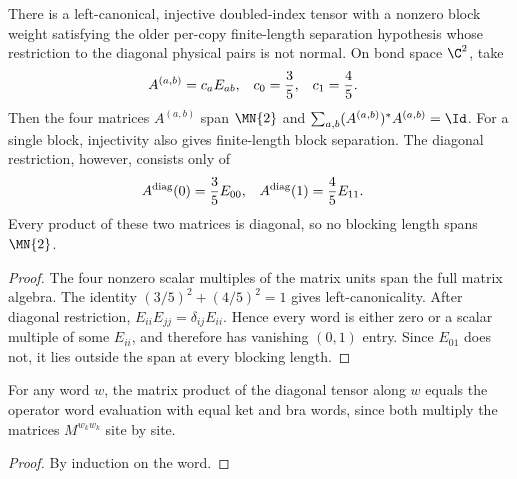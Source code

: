 \begin{theorem}
    \label{thm:diagonal_restriction_not_normal}
    \leanok
    There is a left-canonical, injective doubled-index tensor with a nonzero
    block weight satisfying the older per-copy finite-length separation
    hypothesis whose restriction to the diagonal physical pairs is not normal.
    On bond space $\C^2$, take
    \begin{align}
        A^{(a,b)}&=c_aE_{ab},
        &
        c_0&=\frac35,
        &
        c_1&=\frac45.
        \notag
    \end{align}
    Then the four matrices $A^{(a,b)}$ span $\MN{2}$ and
    $\sum_{a,b}(A^{(a,b)})^*A^{(a,b)}=\Id$.
    For a single block, injectivity also gives finite-length block separation.
    The diagonal restriction, however, consists only of
    \begin{align}
        A^{\mathrm{diag}}(0)&=\frac35E_{00},
        &
        A^{\mathrm{diag}}(1)&=\frac45E_{11}.
        \notag
    \end{align}
    Every product of these two matrices is diagonal, so no blocking length spans
    $\MN{2}$.
\end{theorem}
\begin{proof}\leanok
    The four nonzero scalar multiples of the matrix units span the full matrix
    algebra. The identity $(3/5)^2+(4/5)^2=1$ gives left-canonicality. After
    diagonal restriction, $E_{ii}E_{jj}=\delta_{ij}E_{ii}$.
    Hence every word is either zero or a scalar multiple of some $E_{ii}$, and
    therefore has vanishing $(0,1)$ entry. Since $E_{01}$ does not, it lies
    outside the span at every blocking length.
\end{proof}

\begin{lemma}
    \label{lem:eval_word_diagonal_tensor}
    \leanok
    For any word $w$, the matrix product of the diagonal tensor along $w$ equals the
    operator word evaluation with equal ket and bra words, since both multiply the
    matrices $M^{w_kw_k}$ site by site.
\end{lemma}
\begin{proof}\leanok
    By induction on the word.
\end{proof}

